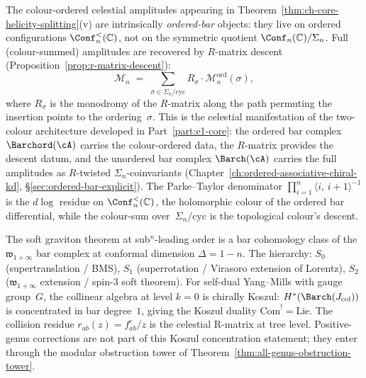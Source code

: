 \begin{remark}
\label{rem:ch-core-colour-ordered-two-colour}
The colour-ordered celestial amplitudes appearing in
Theorem~\ref{thm:ch-core-helicity-splitting}(v) are
intrinsically \emph{ordered-bar} objects: they live on ordered
configurations $\Conf_n^{<}(\C)$, not on the symmetric quotient
$\Conf_n(\C)/\Sigma_n$. Full (colour-summed) amplitudes are
recovered by $R$-matrix descent
(Proposition~\ref{prop:r-matrix-descent}):
\[
 \mathcal{M}_n
 \;=\;
 \sum_{\sigma \in \Sigma_n / \mathrm{cyc}}
 R_\sigma \cdot \mathcal{M}_n^{\mathrm{ord}}(\sigma),
\]
where $R_\sigma$ is the monodromy of the $R$-matrix along the
path permuting the insertion points to the ordering~$\sigma$.
This is the celestial manifestation of the two-colour
architecture developed in Part~\ref{part:e1-core}: the ordered
bar complex $\Barchord(\cA)$ carries the colour-ordered
data, the $R$-matrix provides the descent datum, and the
unordered bar complex $\Barch(\cA)$ carries the full amplitudes
as $R$-twisted $\Sigma_n$-coinvariants
(Chapter~\ref{ch:ordered-associative-chiral-kd},
\S\ref{sec:ordered-bar-explicit}). The Parke--Taylor denominator
$\prod_{i=1}^n \langle i,\, i{+}1 \rangle^{-1}$ is the
$d\log$ residue on $\Conf_n^{<}(\C)$, the holomorphic colour
of the ordered bar differential, while the colour-sum
over~$\Sigma_n/\mathrm{cyc}$ is the topological colour's descent.
\end{remark}

\begin{remark}
\label{rem:ch-core-soft-bar-cohomology}
The soft graviton theorem at sub${}^n$-leading order is a bar
cohomology class of the $\mathfrak{w}_{1+\infty}$ bar complex
at conformal dimension $\Delta = 1 - n$. The hierarchy:
$S_0$ (supertranslation / BMS), $S_1$ (superrotation /
Virasoro extension of Lorentz), $S_2$ ($\mathfrak{w}_{1+\infty}$
extension / spin-$3$ soft theorem). For self-dual Yang--Mills
with gauge group~$G$, the collinear algebra at level $k = 0$
is chirally Koszul: $H^*(\Barch(J_{\mathrm{col}}))$ is concentrated
in bar degree~$1$, giving the Koszul duality
$\mathrm{Com}^! = \mathrm{Lie}$.
The collision residue $r_{ab}(z) = f^c_{ab}/z$ is the celestial
R-matrix at tree level. Positive-genus corrections are not part of
this Koszul concentration statement; they enter through the modular
obstruction tower of Theorem~\ref{thm:all-genus-obstruction-tower}.
\end{remark}

